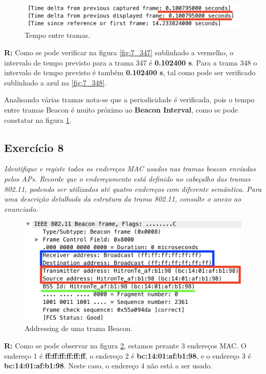 \documentclass{llncs}
\begin{document}
\begin{figure}[H]
\begin{center}
\includegraphics[scale=0.30]{7_2.png} 
\end{center}
\caption{\label{fig:7_2}Tempo entre tramas.}
\end{figure} 
\par
\textbf{R:} Como se pode verificar na figura \ref{fig:7_347} sublinhado a vermelho, o intervalo de tempo previsto para a trama 347 é \textbf{0.102400 s}. Para a trama 348 o intervalo de tempo previsto é também \textbf{0.102400 s}, tal como pode ser verificado sublinhado a azul na \ref{fig:7_348}.

Analisando várias tramas nota-se que a periodicidade é verificada, pois o tempo entre tramas Beacon é muito próximo ao \textbf{Beacon Interval}, como se pode constatar na figura \ref{fig:7_2}.


\subsection{Exercício 8}
\emph{Identifique e registe todos os endereços MAC usados nas tramas beacon enviadas pelos APs. Recorde que o endereçamento está definido no cabeçalho das tramas 802.11, podendo ser utilizados até quatro endereços com diferente semântica. Para uma descrição detalhada da estrutura da trama 802.11, consulte o anexo ao enunciado.}
\begin{figure}[H]
\begin{center}
\includegraphics[scale=0.30]{8.png} 
\end{center}
\caption{\label{fig:8}Addressing de uma trama Beacon.}
\end{figure} 
\par
\textbf{R:} Como se pode observar na figura \ref{fig:8}, estamos perante 3 endereços MAC. O endereço 1 é \textbf{ff:ff:ff:ff:ff:ff}, o endereço 2 é \textbf{bc:14:01:af:b1:98}, e o endereço 3 é \textbf{bc:14:01:af:b1:98}. Neste caso, o endereço 4 não está a ser usado.
\end{document}
